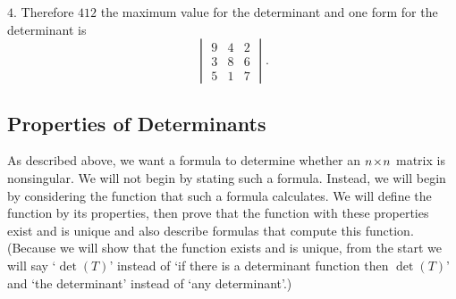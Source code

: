 \begin{exercises}
\begin{answer}
      \( 4 \).
      Therefore \( 412 \) the maximum value for the determinant and one form
      for the determinant is
      \begin{equation*}
         \begin{vmatrix}
            9  &4  &2  \\
            3  &8  &6  \\
            5  &1  &7
         \end{vmatrix}.
      \end{equation*}  
    \end{answer}
\end{exercises}




















\subsection{Properties of Determinants}
As described above, we want a formula
to determine whether an $n \! \times \! n$  matrix is nonsingular.
We will not begin by stating such a formula.
Instead, we will begin by considering the function that such a formula
calculates.
We will define the function by its properties,
then prove that the function with these properties exist and is unique
and also describe formulas that compute this function.
(Because we will show that the function exists and is unique, 
from the start we will say `\( \det(T) \)' instead of
`if there is a determinant function then \( \det(T) \)' and
`the determinant' instead of `any determinant'.)

